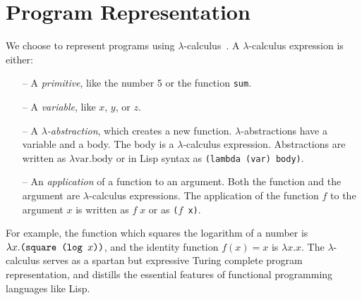 \documentclass{article}
\begin{document}
\section{Program Representation}\label{programrepresentation}
We choose to represent programs using $\lambda$-calculus~\cite{pierce}.
A $\lambda$-calculus expression is either:
\begin{itemize}
  \item[--] A \emph{primitive}, like the number 5 or the function \texttt{sum}.
  \item[--] A \emph{variable}, like $x$, $y$, or $z$.
  \item[--] A $\lambda$\emph{-abstraction}, which creates a new function.  $\lambda$-abstractions have a variable and a body. The body is a $\lambda$-calculus expression. Abstractions are written as $\lambda \text{var}. \text{body}$ or in Lisp syntax as \mbox{\texttt{(lambda (\textrm{var}) \textrm{body})}}.
  \item[--] An \emph{application} of a function to an argument. Both the function and the argument are $\lambda$-calculus expressions. The application of the function $f$ to the argument $x$ is written as $f\; x$ or as \texttt{($f$ x)}.
\end{itemize}

For example, the function which squares the logarithm of a number is
$\lambda x.\text{\tt(square (log $x$))}$, and the identity function $f(x) = x$ is $\lambda x.x$. The
$\lambda$-calculus serves as a spartan but expressive Turing complete
program representation, and distills the essential features of functional
programming languages like Lisp.
\end{document}
